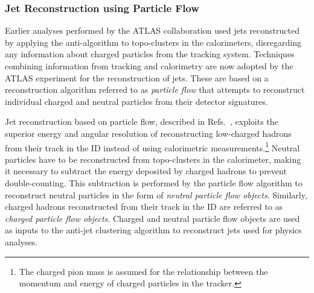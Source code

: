 \subsubsection{Jet Reconstruction using Particle Flow}


Earlier analyses performed by the ATLAS collaboration used jets reconstructed by
applying the anti-\kt algorithm to topo-clusters in the calorimeters,
disregarding any information about charged particles from the tracking
system. Techniques combining information from tracking and calorimetry are now
adopted by the ATLAS experiment for the reconstruction of jets. These are based
on a reconstruction algorithm referred to as \emph{particle flow} that attempts
to reconstruct individual charged and neutral particles from their detector
signatures.

Jet reconstruction based on particle flow, described in
Refs.~\cite{PERF-2015-09,JETM-2018-05}, exploits the superior energy and angular
resolution of reconstructing low-\pT charged hadrons from their track in the ID
instead of using calorimetric measurements.\footnote{The charged pion mass is
  assumed for the relationship between the momentum and energy of charged
  particles in the tracker.} Neutral particles have to be reconstructed from
topo-clusters in the calorimeter, making it necessary to subtract the energy
deposited by charged hadrons to prevent double-counting. This subtraction is
performed by the particle flow algorithm to reconstruct neutral particles in the
form of \emph{neutral particle flow objects}. Similarly, charged hadrons
reconstructed from their track in the ID are referred to as \emph{charged
  particle flow objects}.  Charged and neutral particle flow objects are used as
inputs to the anti-\kt jet clustering algorithm to reconstruct jets used for
physics analyses.

